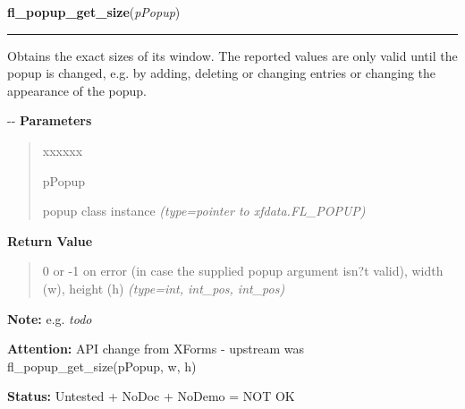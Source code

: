 \hspace{.8\funcindent}\begin{boxedminipage}{\funcwidth}

    \raggedright \textbf{fl\_popup\_get\_size}(\textit{pPopup})

    \vspace{-1.5ex}

    \rule{\textwidth}{0.5\fboxrule}
\setlength{\parskip}{2ex}

Obtains the exact sizes of its window. The reported values are
only valid until the popup is changed, e.g. by adding, deleting or
changing entries or changing the appearance of the popup.

-{}-
\setlength{\parskip}{1ex}
      \textbf{Parameters}
      \vspace{-1ex}

      \begin{quote}
        \begin{Ventry}{xxxxxx}

          \item[pPopup]


popup class instance
            {\it (type=pointer to xfdata.FL\_POPUP)}

        \end{Ventry}

      \end{quote}

      \textbf{Return Value}
    \vspace{-1ex}

      \begin{quote}

0 or -1 on error (in case the supplied popup argument isn?t
valid), width (w), height (h)
      {\it (type=int, int\_pos, int\_pos)}

      \end{quote}

\textbf{Note:} 
e.g. \emph{todo}


\textbf{Attention:} 
API change from XForms - upstream was
fl\_popup\_get\_size(pPopup, w, h)


\textbf{Status:} 
Untested + NoDoc + NoDemo = NOT OK


    \end{boxedminipage}

    \label{xformslib:flpopup:fl_popup_get_min_width}


